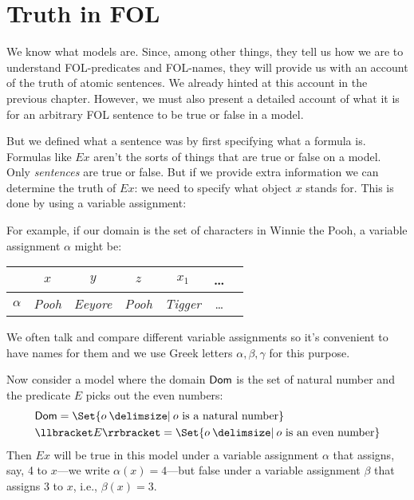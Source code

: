 \chapter{Truth in FOL}\label{s:TruthFOL}
We know what models are. Since, among other things, they tell us how we are to understand FOL-predicates and FOL-names, they will provide us with an account of the truth of atomic sentences. We already hinted at this account in the previous chapter. However, we must also present a detailed account of what it is for an arbitrary FOL sentence to be true or false in a model.

But we defined what a sentence was by first specifying what a formula is. Formulas like $Ex$ aren't the sorts of things that are true or false on a model. Only \emph{sentences} are true or false. But if we provide extra information we can determine the truth of $Ex$: we need to specify what object $x$ stands for. This is done by using a variable assignment: 

For example, if our domain is the set of characters in Winnie the Pooh, a variable assignment $\alpha$ might be:
\begin{center}
	\begin{tabular}{r@{\,:\quad}cccccc}
		\omit & $x$ & $y$ & $z$ & $x_1$ & \ldots \\ \hline
		$\alpha$ & \emph{Pooh} & \emph{Eeyore} & \emph{Pooh} & \emph{Tigger} & \ldots
	\end{tabular}
\end{center}



We often talk and compare different variable assignments so it's convenient to have names for them and we use Greek letters $\alpha, \beta,\gamma$ for this purpose. 

Now consider a model where the domain $\mathsf{Dom}$ is the set of natural number and the predicate $E$ picks out the even numbers:
\begin{align*}&\domain=\Set{o \given  o\text{ is a natural number}}\\
&\denote{E}=\Set{o \given o\text{ is an even number}}\end{align*}
Then $Ex$ will be true in this model under a variable assignment $\alpha$ that assigns, say, 4 to $x$---we write $\alpha(x)=4$---but false under a variable assignment $\beta$ that assigns 3 to $x$, i.e., $\beta(x)=3$.




